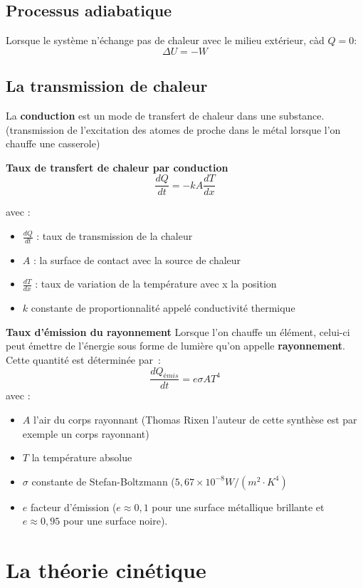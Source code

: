 \documentclass{article}
\begin{document}
\subsection{Processus adiabatique}
Lorsque le système n'échange pas de chaleur avec le milieu extérieur, càd $Q = 0$:
\[\Delta U = -W\]

\subsection{La transmission de chaleur}
La \textbf{conduction} est un mode de transfert de chaleur dans une substance. (transmission de l'excitation des atomes de proche dans le métal lorsque l'on chauffe une casserole)
\newline

\noindent
\textbf{Taux de transfert de chaleur par conduction}
\[\frac{dQ}{dt} = -kA\frac{dT}{dx}\]

avec :
\begin{itemize}
    \item $\frac{dQ}{dt}$ : taux de transmission de la chaleur
    \item $A$ : la surface de contact avec la source de chaleur
    \item $\frac{dT}{dx}$ : taux de variation de la température avec x la position
    \item $k$ constante de proportionnalité appelé conductivité thermique
\end{itemize}
\newline

\noindent
\textbf{Taux d'émission du rayonnement}
Lorsque l'on chauffe un élément, celui-ci peut émettre de l'énergie sous forme de lumière qu'on appelle \textbf{rayonnement}. Cette quantité est déterminée par :
\[\frac{dQ_{émis}}{dt} = e\sigma AT^4\]
avec :
\begin{itemize}
    \item $A$ l'air du corps rayonnant (Thomas Rixen l'auteur de cette synthèse est par exemple un corps rayonnant)
    \item $T$ la température absolue
    \item $\sigma$ constante de Stefan-Boltzmann ($5,67\times10^{-8}W/(m^2\cdot K^4)$
    \item $e$ facteur d'émission ($e \approx 0,1$ pour une surface métallique brillante et $e \approx 0,95$ pour une surface noire).
\end{itemize}


\section{La théorie cinétique}
\end{document}
